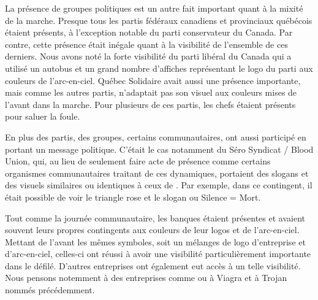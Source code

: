 La présence de groupes politiques est un autre fait important quant à la mixité de la marche.
Presque tous les partis fédéraux canadiens et provinciaux québécois étaient présents, à l'exception notable du parti conservateur du Canada.
Par contre, cette présence était inégale quant à la visibilité de l'ensemble de ces derniers.
Nous avons noté la forte visibilité du parti libéral du Canada qui a utilisé un autobus et un grand nombre d'affiches représentant le logo du parti aux couleurs de l'arc-en-ciel.
Québec Solidaire avait aussi une présence importante, mais comme les autres partis, n'adaptait pas son visuel aux couleurs mises de l'avant dans la marche.
Pour plusieurs de ces partis, les chefs étaient présents pour saluer la foule.

En plus des partis, des groupes, certains communautaires, ont aussi participé en portant un message politique.
C'était le cas notamment du Séro Syndicat / Blood Union, qui, au lieu de seulement faire acte de présence comme certains organismes communautaires traitant de ces dynamiques, portaient des slogans et des visuels similaires ou identiques à ceux de .
Par exemple, dans ce contingent, il était possible de voir le triangle rose et le slogan  ou Silence = Mort.

Tout comme la journée communautaire, les banques étaient présentes et avaient souvent leurs propres contingents aux couleurs de leur logos et de l'arc-en-ciel.
Mettant de l'avant les mêmes symboles, soit un mélanges de logo d'entreprise et d'arc-en-ciel, celles-ci ont réussi à avoir une visibilité particulièrement importante dans le défilé.
D'autres entreprises ont également eut accès à un telle visibilité.
Nous pensons notemment à des entreprises comme  ou à Viagra et à Trojan nommés précédemment.


